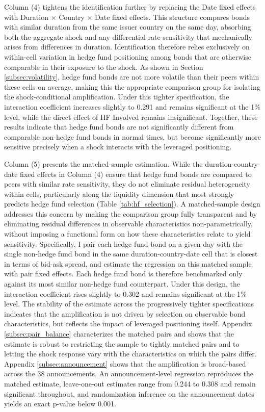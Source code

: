 \documentclass[english, 11pt, oneside]{article}
\begin{document}
Column (4) tightens the identification further by replacing the Date fixed effects with Duration $\times$ Country $\times$ Date fixed effects. This structure compares bonds with similar duration from the same issuer country on the same day, absorbing both the aggregate shock and any differential rate sensitivity that mechanically arises from differences in duration. Identification therefore relies exclusively on within-cell variation in hedge fund positioning among bonds that are otherwise comparable in their exposure to the shock. As shown in Section \ref{subsec:volatility}, hedge fund bonds are not more volatile than their peers within these cells on average, making this the appropriate comparison group for isolating the shock-conditional amplification. Under this tighter specification, the interaction coefficient increases slightly to 0.291 and remains significant at the 1\% level, while the direct effect of HF Involved remains insignificant. Together, these results indicate that hedge fund bonds are not significantly different from comparable non-hedge fund bonds in normal times, but become significantly more sensitive precisely when a shock interacts with the leveraged positioning.

Column (5) presents the matched-sample estimation. While the duration-country-date fixed effects in Column (4) ensure that hedge fund bonds are compared to peers with similar rate sensitivity, they do not eliminate residual heterogeneity within cells, particularly along the liquidity dimension that most strongly predicts hedge fund selection (Table \ref{tab:hf_selection}). A matched-sample design addresses this concern by making the comparison group fully transparent and by eliminating residual differences in observable characteristics non-parametrically, without imposing a functional form on how these characteristics relate to yield sensitivity. Specifically, I pair each hedge fund bond on a given day with the single non-hedge fund bond in the same duration-country-date cell that is closest in terms of bid-ask spread, and estimate the regression on this matched sample with pair fixed effects. Each hedge fund bond is therefore benchmarked only against its most similar non-hedge fund counterpart. Under this design, the interaction coefficient rises slightly to 0.302 and remains significant at the 1\% level. The stability of the estimate across the progressively tighter specifications indicates that the amplification is not driven by selection on observable bond characteristics, but reflects the impact of leveraged positioning itself. Appendix \ref{subsec:pair_balance} characterizes the matched pairs and shows that the estimate is robust to restricting the sample to tightly matched pairs and to letting the shock response vary with the characteristics on which the pairs differ. Appendix \ref{subsec:announcement} shows that the amplification is broad-based across the 38 announcements. An announcement-level regression reproduces the matched estimate, leave-one-out estimates range from 0.244 to 0.308 and remain significant throughout, and randomization inference on the announcement dates yields an exact p-value below 0.001.
\end{document}
